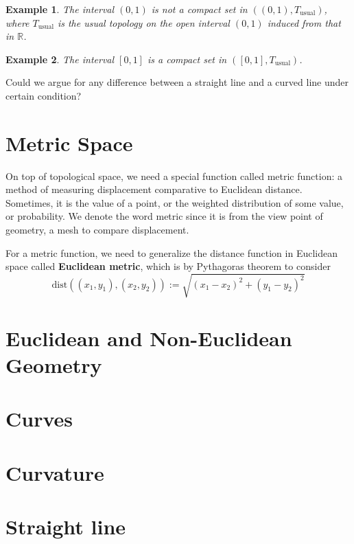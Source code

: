\documentclass[12pt]{article}
\newtheorem*{example}{Example}
\begin{document}
    \begin{example}
        The interval $(0,1)$ is not a compact set in $((0,1),T_{\textrm{usual}})$, where $T_{\textrm{usual}}$ is the usual topology on the open interval $(0,1)$ induced from that in $\mathbb{R}$.
    \end{example}

    \begin{example}
        The interval $[0,1]$ is a compact set in $([0,1],T_{\textrm{usual}})$.
    \end{example}

    Could we argue for any difference between a straight line and a curved line under certain condition? 

    \section{Metric Space}

    On top of topological space, we need a special function called metric function: a method of measuring displacement comparative to Euclidean distance. Sometimes, it is the value of a point, or the weighted distribution of some value, or probability. We denote the word metric since it is from the view point of geometry, a mesh to compare displacement.
    
    For a metric function, we need to generalize the distance function in Euclidean space called \textbf{Euclidean metric}, which is by Pythagoras theorem to consider \[\mathrm{dist}((x_1,y_1),(x_2,y_2)):=\sqrt{(x_1-x_2)^2+(y_1-y_2)^2}\]

    \section{Euclidean and Non-Euclidean Geometry}

    \section{Curves}

    \section{Curvature}

    \section{Straight line}
    
\end{document}
